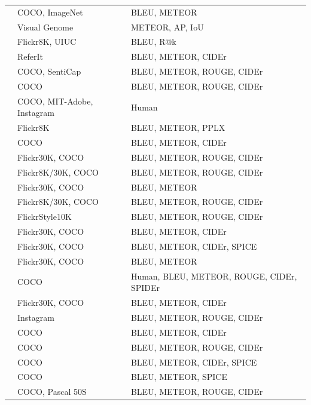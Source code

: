 \begin{longtable}{ p{} p{} p{} }
    \citet{Hendricks2016} & COCO, ImageNet & BLEU, METEOR \\
    \citet{Johnson2016} & Visual Genome & METEOR, AP, IoU \\
    \citet{Ma2016} & Flickr8K, UIUC & BLEU, R@k \\
    \citet{Mao2016} & ReferIt & BLEU, METEOR, CIDEr \\
    \citet{Mathews2016} & COCO, SentiCap & BLEU, METEOR, ROUGE, CIDEr \\
    \citet{Sugano2016} & COCO & BLEU, METEOR, ROUGE, CIDEr \\
    \citet{Tran2016} & COCO, MIT-Adobe, Instagram &  Human\\
    \citet{Wang2016_Parallel} & Flickr8K & BLEU, METEOR, PPLX \\
    \citet{Yang2016_RevNet} & COCO & BLEU, METEOR, CIDEr \\
    \citet{You2016} & Flickr30K, COCO & BLEU, METEOR, ROUGE, CIDEr \\
    \citet{Chen2017_SCA} & Flickr8K/30K, COCO & BLEU, METEOR, ROUGE, CIDEr \\
    \citet{Dai2017_CGAN} & Flickr30K, COCO & BLEU, METEOR \\
    \citet{Fu2017} & Flickr8K/30K, COCO & BLEU, METEOR, ROUGE, CIDEr \\
    \citet{Gan2017_Style} & FlickrStyle10K & BLEU, METEOR, ROUGE, CIDEr \\
    \citet{Gan2017_SCN} & Flickr30K, COCO &  BLEU, METEOR, CIDEr \\
    \citet{Gu2017} & Flickr30K, COCO & BLEU, METEOR, CIDEr, SPICE \\
    \citet{Liu2017_SAM} & Flickr30K, COCO & BLEU, METEOR \\
    \citet{Liu2017_PG} & COCO & Human, BLEU, METEOR, ROUGE, CIDEr, SPIDEr \\
    \citet{Lu2017} & Flickr30K, COCO & BLEU, METEOR, CIDEr \\
    \citet{Park2017} & Instagram & BLEU, METEOR, ROUGE, CIDEr \\
    \citet{Pedersoli2017} & COCO & BLEU, METEOR, CIDEr \\
    \citet{Ren2017} & COCO & BLEU, METEOR, ROUGE, CIDEr \\
    \citet{Rennie2017} & COCO & BLEU, METEOR, CIDEr, SPICE \\
    \citet{Shetty2017} & COCO & BLEU, METEOR, SPICE \\
    \citet{Tavakoliy2017} & COCO, Pascal 50S & BLEU, METEOR, ROUGE, CIDEr \\

\end{longtable}
